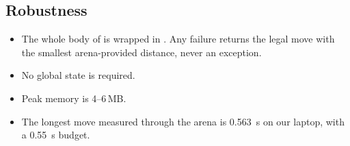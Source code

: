 \subsection{Robustness}
\begin{itemize}
  \item The whole body of  is wrapped in . Any failure
        returns the legal move with the smallest arena-provided distance, never an exception.
  \item No global state is required.
  \item Peak memory is 4--6\,MB.
  \item The longest move measured through the arena is \SI{0.563}{\second} on our laptop, with
        a \SI{0.55}{\second} budget.
\end{itemize}
